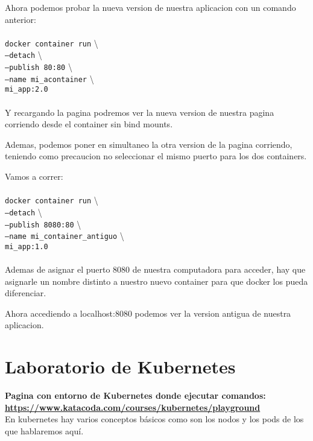 \documentclass[11pt]{article} %
\begin{document}
Ahora podemos probar la nueva version de nuestra aplicacion con un comando anterior: \\ \\
	\texttt{docker container run}  \textbackslash \\
	\texttt{--detach}  \textbackslash \\
	\texttt{--publish 80:80} \textbackslash \\
	\texttt{--name mi\_acontainer}  \textbackslash \\
	\texttt{mi\_app:2.0} \\ \\

Y recargando la pagina podremos ver la nueva version de nuestra pagina corriendo desde el container sin bind mounts. 

Ademas, podemos poner en simultaneo la otra version de la pagina corriendo, teniendo como precaucion no seleccionar el mismo puerto para los dos containers.

Vamos a correr: \\ \\
	\texttt{docker container run}  \textbackslash \\
	\texttt{--detach}  \textbackslash \\
	\texttt{--publish 8080:80}  \textbackslash \\
	\texttt{--name mi\_container\_antiguo}  \textbackslash \\
	\texttt{mi\_app:1.0} \\ \\

Ademas de asignar el puerto 8080 de nuestra computadora para acceder, hay que asignarle un nombre distinto a nuestro nuevo container para que docker los pueda diferenciar.

Ahora accediendo a localhost:8080 podemos ver la version antigua de nuestra aplicacion.



\section{Laboratorio de Kubernetes}

\textbf{Pagina con entorno de Kubernetes donde ejecutar comandos:\\\url{https://www.katacoda.com/courses/kubernetes/playground}} \\

En kubernetes hay varios conceptos básicos como son los nodos y los pods de los que hablaremos aquí.
\end{document}
